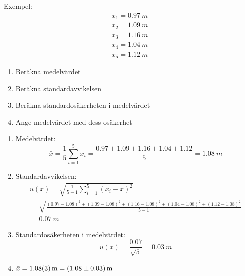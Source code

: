\documentclass[9pt]{beamer}
\newcommand*\mean[1]{\bar{#1}}
\begin{document}
    

    \begin{frame}
        Exempel:
        \begin{gather*}
            x_1 = \SI{0.97}{m}\\
            x_2 = \SI{1.09}{m}\\
            x_3 = \SI{1.16}{m}\\
            x_4 = \SI{1.04}{m}\\
            x_5 = \SI{1.12}{m}
        \end{gather*}

        \begin{enumerate}
            \item Beräkna medelvärdet
            \item Beräkna standardavvikelsen
            \item Beräkna standardosäkerheten i medelvärdet
            \item Ange medelvärdet med dess osäkerhet
        \end{enumerate}

        \end{frame}
        \begin{frame}

            \begin{enumerate}
                \item<+-> Medelvärdet:
                    \begin{equation*}
                        \mean{x} = \frac15 \sum_{i=1}^5 x_i = \frac{0.97 + 1.09 + 1.16 + 1.04 + 1.12}{5} = \SI{1.08}{m}
                    \end{equation*}

                \item<+-> Standardavvikelsen:
                    \begin{gather*}
                        u(x) = \sqrt{\frac1{5-1} \sum_{i=1}^5 \left(x_i - \mean{x}\right)^2} \\= \sqrt{\frac{(0.97 - 1.08)^2 + (1.09 - 1.08)^2 + (1.16 - 1.08)^2 + (1.04 - 1.08)^2 + (1.12 - 1.08)^2}{5-1}} \\= \SI{0.07}{m}
                    \end{gather*}

                \item<+-> Standardosäkerheten i medelvärdet:
                    \begin{equation*}
                        u(\mean{x}) = \frac{0.07}{\sqrt5} = \SI{0.03}{m}
                    \end{equation*}

                \item<+-> $\mean{x} = \SI{1.08\pm0.03}{m} = \SI[separate-uncertainty=true]{1.08\pm0.03}{m}$
            \end{enumerate}
    \end{frame}
\end{document}
